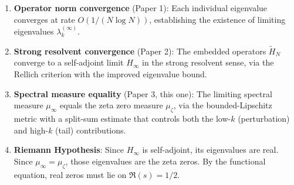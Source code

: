 \documentclass[11pt,a4paper]{article}
\begin{document}
\begin{enumerate}
\item \textbf{Operator norm convergence} (Paper 1): Each individual
  eigenvalue converges at rate $O(1/(N\log N))$, establishing the
  existence of limiting eigenvalues $\lambda_k^{(\infty)}$.

\item \textbf{Strong resolvent convergence} (Paper 2): The embedded
  operators $\widetilde{H}_N$ converge to a self-adjoint limit
  $H_\infty$ in the strong resolvent sense, via the Rellich criterion
  with the improved eigenvalue bound.

\item \textbf{Spectral measure equality} (Paper 3, this one): The
  limiting spectral measure $\mu_\infty$ equals the zeta zero
  measure $\mu_\zeta$, via the bounded-Lipschitz metric with a
  split-sum estimate that controls both the low-$k$ (perturbation)
  and high-$k$ (tail) contributions.

\item \textbf{Riemann Hypothesis}: Since $H_\infty$ is self-adjoint,
  its eigenvalues are real. Since $\mu_\infty = \mu_\zeta$, those
  eigenvalues are the zeta zeros. By the functional equation, real
  zeros must lie on $\Re(s) = 1/2$.
\end{enumerate}
\end{document}

